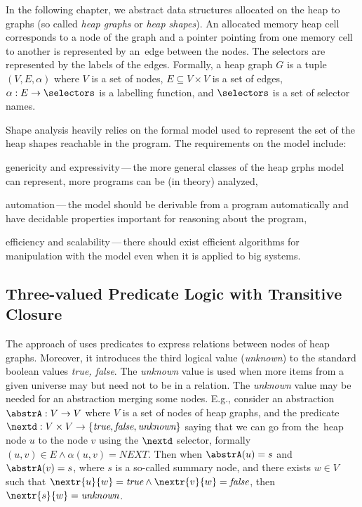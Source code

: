 
In the following chapter, we abstract data structures allocated on the heap to graphs (so called \emph{heap graphs}
or \emph{heap shapes}).
An allocated memory heap cell corresponds to a node of the graph and a pointer pointing from one memory cell
to another is represented by an~edge between the nodes.
The selectors are represented by the labels of the edges.
Formally, a heap graph $G$ is a tuple $(V,E,\alpha)$ where $V$ is a set of nodes, $E \subseteq V \times V$ is
a set of edges, $\alpha: E \rightarrow \selectors$ is a labelling function, and $\selectors$ is a set
of selector names.

	  Shape analysis heavily relies on the formal model used to represent the set of the heap shapes
	  reachable in the program.
	  The requirements on the model include:
	  \begin{enumerate*}[label=(\alph*)]
	  	\item genericity and expressivity\,---\,the more general classes of the heap grphs model can represent,
                      more programs can be (in theory) analyzed,
	  	\item automation\,---\,the model should be derivable from a program automatically and have decidable
			properties important for reasoning about the program,
	  	\item efficiency and scalability\,---\,there should exist efficient algorithms for manipulation with the model
			even when it is applied to big systems.
	  \end{enumerate*}

	  \subsection{Three-valued Predicate Logic with Transitive Closure}
	  \label{subsec:tvl}
	  The approach of \cite{pale} uses predicates to express relations between nodes of heap graphs.
	  Moreover, it introduces the third logical value (\emph{unknown}) to the standard
	  boolean values \emph{true, false}. The \emph{unknown} value is used when
	  more items from a given universe may but need not to be in a relation.
	  The \emph{unknown} value may be needed for an abstraction merging some nodes. E.g., consider
	  an abstraction $\abstrA: V \rightarrow V$ where $V$ is a set of nodes
	  of heap graphs, and the predicate $\nextd: V \times V\rightarrow\{\emph{true}, \emph{false}, \emph{unknown}\}$
          saying that we can go from the~heap node $u$ to the node $v$ using the $\nextd$ selector, formally $(u,v)\in E \wedge \alpha(u,v)=NEXT$.
	  Then when $\abstrA(u) = s$ and $\abstrA(v) = s$, where $s$ is a so-called summary node,
	  and there exists $w \in V$ such that $\nextr{u}{w} = \emph{true} \wedge
	  \nextr{v}{w} = \emph{false}$, then $\nextr{s}{w} = \emph{unknown}$.

